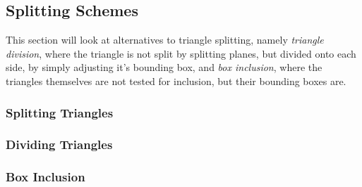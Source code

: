 \subsection{Splitting Schemes}\label{sec:splittingGeom}

This section will look at alternatives to triangle splitting, namely
\textit{triangle division}, where the triangle is not split by
splitting planes, but divided onto each side, by simply adjusting it's
bounding box, and \textit{box inclusion}, where the triangles
themselves are not tested for inclusion, but their bounding boxes are.




\subsubsection{Splitting Triangles}


\subsubsection{Dividing Triangles}




\subsubsection{Box Inclusion}






